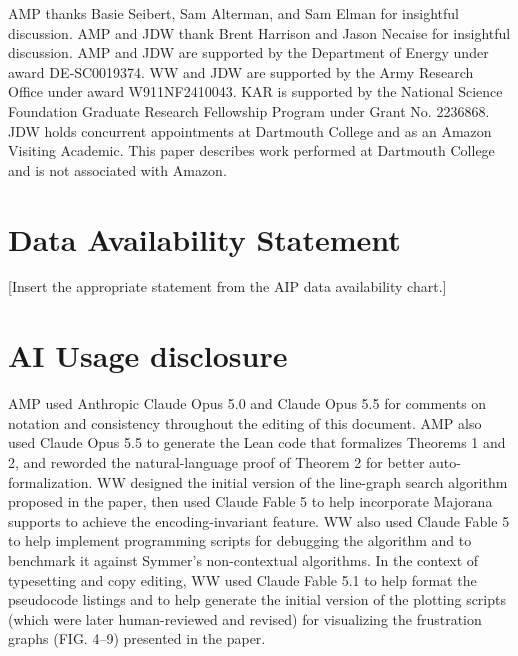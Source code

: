 \documentclass[%
 aip,
 amsmath,amssymb,
 reprint,%
]{revtex4-1}
\begin{document}
\begin{acknowledgments}
\indent AMP thanks Basie Seibert, Sam Alterman, and Sam Elman for insightful discussion. AMP and JDW thank Brent Harrison and Jason Necaise for insightful discussion. AMP and JDW are supported by the Department of Energy under award DE‐SC0019374. WW and JDW are supported by the Army Research Office under award W911NF2410043. KAR is supported by the National Science Foundation Graduate Research Fellowship Program under Grant No. 2236868.
JDW holds concurrent appointments at Dartmouth College and as an Amazon Visiting Academic. This paper describes work performed at Dartmouth College and is not associated with Amazon.
\end{acknowledgments}

\section*{Data Availability Statement}

{\color{red} [Insert the appropriate statement from the AIP data availability chart.]}

\section*{AI Usage disclosure}

AMP used Anthropic Claude Opus 5.0 and Claude Opus 5.5 for comments on notation and consistency throughout the editing of this document. AMP also used Claude Opus 5.5 to generate the Lean code that formalizes Theorems 1 and 2, and reworded the natural-language proof of Theorem 2 for better auto-formalization. WW designed the initial version of the line-graph search algorithm proposed in the paper, then used Claude Fable 5 to help incorporate Majorana supports to achieve the encoding-invariant feature. WW also used Claude Fable 5 to help implement programming scripts for debugging the algorithm and to benchmark it against Symmer's non-contextual algorithms. In the context of typesetting and copy editing, WW used Claude Fable 5.1 to help format the pseudocode listings and to help generate the initial version of the plotting scripts (which were later human-reviewed and revised) for visualizing the frustration graphs (FIG. 4--9) presented in the paper. 


\end{document}
